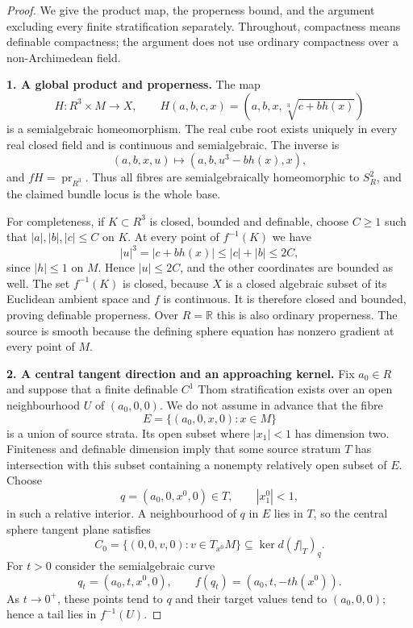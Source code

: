 \begin{proof}
We give the product map, the properness bound, and the argument excluding
every finite stratification separately. Throughout, compactness means
definable compactness; the argument does not use ordinary compactness
over a non-Archimedean field.

\medskip\noindent\textbf{1. A global product and properness.}
The map
\[
 H:R^3\times M\longrightarrow X,\qquad
 H(a,b,c,x)=(a,b,x,\sqrt[3]{c+bh(x)})
 \tag{A5.15.2}
\]
is a semialgebraic homeomorphism. The real cube root exists uniquely in
every real closed field and is continuous and semialgebraic. The inverse
is
\[
 (a,b,x,u)\longmapsto(a,b,u^3-bh(x),x),
\]
and $fH=\operatorname{pr}_{R^3}$. Thus all fibres are semialgebraically
homeomorphic to $S^2_R$, and the claimed bundle locus is the whole base.

For completeness, if $K\subset R^3$ is closed, bounded and definable,
choose $C\ge1$ such that $|a|,|b|,|c|\le C$ on $K$.
At every point of $f^{-1}(K)$ we have
\[
 |u|^3=|c+bh(x)|\le |c|+|b|\le2C,
\]
since $|h|\le1$ on $M$. Hence $|u|\le2C$, and the other coordinates
are bounded as well. The set $f^{-1}(K)$ is closed, because $X$ is a
closed algebraic subset of its Euclidean ambient space and $f$ is
continuous. It is therefore closed and bounded, proving definable
properness. Over $R=\mathbb R$ this is also ordinary properness.
The source is smooth because the defining sphere equation has nonzero
gradient at every point of $M$.

\medskip\noindent\textbf{2. A central tangent direction and an approaching kernel.}
Fix $a_0\in R$ and suppose that a finite definable $C^1$ Thom
stratification exists over an open neighbourhood $U$ of $(a_0,0,0)$.
We do not assume in advance that the fibre
\[
 E=\{(a_0,0,x,0):x\in M\}
\]
is a union of source strata. Its open subset where $|x_1|<1$ has
dimension two. Finiteness and definable dimension imply that some
source stratum $T$ has intersection with this subset containing a
nonempty relatively open subset of $E$. Choose
\[
 q=(a_0,0,x^0,0)\in T,\qquad |x^0_1|<1,
\]
in such a relative interior. A neighbourhood of $q$ in $E$ lies in
$T$, so the central sphere tangent plane satisfies
\[
 C_0=\{(0,0,v,0):v\in T_{x^0}M\}
                   \subseteq\ker d(f|_T)_q.
 \tag{A5.15.3}
\]
For $t>0$ consider the semialgebraic curve
\[
 q_t=(a_0,t,x^0,0),\qquad
 f(q_t)=(a_0,t,-t h(x^0)).
 \tag{A5.15.4}
\]
As $t\to0^+$, these points tend to $q$ and their target values tend
to $(a_0,0,0)$; hence a tail lies in $f^{-1}(U)$.


\end{proof}

